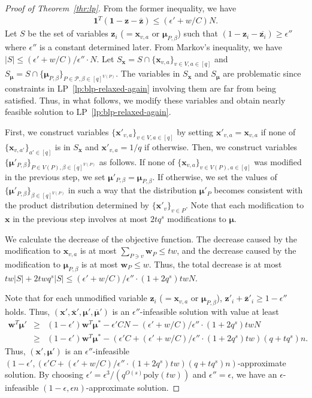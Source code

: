 \documentclass[letterpaper, 11pt]{article}
\newcommand{\calP}{\mathcal{P}}
\newcommand{\biw}{\boldsymbol{w}}
\newcommand{\bix}{\boldsymbol{x}}
\newcommand{\biz}{\boldsymbol{z}}
\newcommand{\bimu}{\boldsymbol{\mu}}
\newcommand{\poly}{\mathrm{poly}}
\begin{document}
\begin{proof}[Proof of Theorem~\ref{thr:lp}]
  From the former inequality, we have
  \begin{eqnarray*}
    \mathbf{1}^T(\mathbf{1}-\biz-\overline{\biz}) \leq (\epsilon'+w/C)N.
  \end{eqnarray*}
  Let $S$ be the set of variables $\biz_i$ ($= \bix_{v,a}$ or $\bimu_{P,\beta}$) such that $(1-\biz_i-\overline{\biz_i}) \geq \epsilon''$ where $\epsilon''$ is a constant determined later.
  From Markov's inequality,
  we have $|S|\leq (\epsilon'+w/C)/\epsilon''\cdot N$.
  Let $S_{\bix}= S\cap \{\bix_{v,a}\}_{v\in V,a\in [q]}$ and $S_{\bimu}=S\cap \{\bimu_{P,\beta}\}_{P\in \calP,\beta\in [q]^{V(P)}}$.
  The variables in $S_{\bix}$ and $S_{\bimu}$ are problematic since constraints in LP~\eqref{lp:blp-relaxed-again} involving them are far from being satisfied.
  Thus, in what follows,
  we modify these variables and obtain nearly feasible solution to LP~\eqref{lp:blp-relaxed-again}.

  First, we construct variables $\{\bix'_{v,a}\}_{v\in V, a\in [q]}$ by setting $\bix'_{v,a}=\bix_{v,a}$ if none of $\{\bix_{v,a'}\}_{a'\in[q]}$ is in $S_{\bix}$ and $\bix'_{v,a}=1/q$ if otherwise.
  Then, we construct variables $\{\bimu'_{P,\beta}\}_{P\in V(P), \beta\in [q]^{V(P)}}$ as follows.
  If none of $\{\bix_{v,a}\}_{v\in V(P), a\in[q]}$ was modified in the previous step,
  we set $\bimu'_{P,\beta}=\bimu_{P,\beta}$.
  If otherwise, 
  we set the values of $\{\bimu'_{P,\beta}\}_{\beta\in [q]^{V(P)}}$ in such a way that the distribution $\bimu'_P$ becomes consistent with the product distribution determined by $\{\bix'_{v}\}_{v\in P}$.
  Note that each modification to $\bix$ in the previous step involves at most $2tq^s$ modifications to $\bimu$.

  We calculate the decrease of the objective function.
  The decrease caused by the modification to $\bix_{v,a}$ is at most $\sum_{P\ni v}\biw_P\leq tw$,
  and the decrease caused by the modification to $\bimu_{P,\beta}$ is at most $\biw_P \leq w$.
  Thus, the total decrease is at most $tw|S|+2twq^s|S| \leq (\epsilon'+w/C)/\epsilon''\cdot(1+2q^s)tw N$.
  
  Note that for each unmodified variable $\biz_i$ ($= \bix_{v,a}$ or $\bimu_{P,\beta}$), 
  $\biz'_i+\overline{\biz}'_i \geq 1-\epsilon''$ holds.
  Thus, $(\bix',\overline{\bix}',\bimu',\overline{\bimu}')$ is an $\epsilon''$-infeasible solution with value at least 
  \begin{eqnarray*}
    \biw^T \bimu' 
    &\geq&
    (1-\epsilon')\biw^T\bimu^*- \epsilon' C N-(\epsilon'+w/C)/\epsilon''\cdot (1+2q^s)tw N\\
    &\geq &
    (1-\epsilon')\biw^T\bimu^* - (\epsilon' C + (\epsilon'+w/C)/\epsilon''\cdot (1+2q^s)tw ) (q+tq^s)n.
  \end{eqnarray*}
  Thus, $(\bix',\bimu')$ is an $\epsilon''$-infeasible $(1-\epsilon',(\epsilon' C + (\epsilon'+w/C)/\epsilon''\cdot (1+2q^s)tw ) (q+tq^s)n)$-approximate solution.
  By choosing $\epsilon'=\epsilon^3/(q^{O(s)}\poly(tw))$ and $\epsilon''=\epsilon$,
  we have an $\epsilon$-infeasible $(1-\epsilon,\epsilon n)$-approximate solution.


\end{proof}
\end{document}
